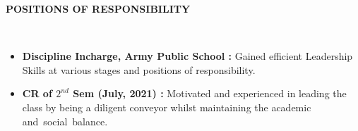\documentclass[a4paper,10pt]{article}
\newcommand{\lsep}{-0.5cm}
\newcommand{\resheading}[1]{{\small \colorbox{mygrey}{\begin{minipage}{0.975\textwidth}{\textbf{#1 \vphantom{p\^{E}}}}\end{minipage}}}}
\begin{document}
\resheading{\textbf{POSITIONS OF RESPONSIBILITY} }\\[\lsep]
\begin{itemize}
\setlength\itemsep{0em}
\item \noindent \textbf{Discipline Incharge, Army Public School :} Gained efficient Leadership Skills at various stages and positions of responsibility.
\item \noindent \textbf{CR of ${2^{nd}}$ Sem (July, 2021) :}  Motivated and experienced in leading the class by being a diligent conveyor whilst maintaining the academic and social balance.

\end{itemize}
\end{document}
